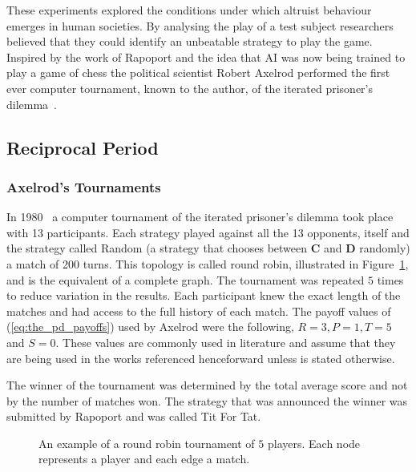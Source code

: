 \documentclass{article}
\begin{document}
These experiments explored the conditions under which altruist behaviour emerges
in human societies. By analysing the play of a test subject researchers believed
that they could identify an unbeatable strategy to play the game. Inspired by 
the work of Rapoport and the idea that AI was now being trained to play a 
game of chess the political scientist Robert Axelrod performed
the first ever computer tournament, known to the author, of the iterated 
prisoner's dilemma~\cite{axelrod2012, Axelrod1981}.

\subsection{Reciprocal Period}\label{subsection:reciprocal}

\subsubsection{Axelrod's Tournaments}\label{subsection:axelrods_tournament}

In 1980~\cite{axelrod1980a} a computer tournament of the iterated prisoner's
dilemma took place with 13 participants. Each strategy played against all the
13 opponents, itself and the strategy called Random (a strategy that chooses
between \textbf{C} and \textbf{D} randomly) a match of 200 turns. This topology
is called round robin, illustrated in Figure~\ref{fig:round_robin_topology}, and is the
equivalent of a complete graph. The tournament was repeated \(5\) times to
reduce variation in the results. Each participant knew the exact length of the
matches and had access to the full history of each match. The payoff values of
(\ref{eq:the_pd_payoffs}) used by Axelrod were the following, \(R=3, P=1, T=5\)
and \(S=0\). These values are commonly used in literature and assume that they are
being used in the works referenced henceforward unless is stated otherwise.

The winner of the tournament was determined by the total average score and not by
the number of matches won. The strategy that was announced the winner was
submitted by Rapoport and was called Tit For Tat.

\begin{figure}[!hbtp]
    \centering
    
    \caption{An example of a round robin tournament of \(5\) players. Each 
    node represents a player and each edge a match.}
    \label{fig:round_robin_topology}
\end{figure}
\end{document}
